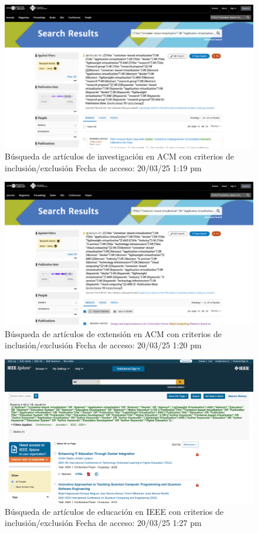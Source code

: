 \FloatBarrier\begin{figure}[H]
	\centering
	\includegraphics[width=\textwidth,keepaspectratio]{apendices/BD/criterios/ACM-inv.png}
	\caption{Búsqueda de artículos de investigación en ACM con criterios de inclusión/exclusión
		Fecha de acceso: 20/03/25 1:19 pm
	}\label{fig:busqueda17}
\end{figure}
\FloatBarrier\begin{figure}[H]
	\centering
	\includegraphics[width=\textwidth,keepaspectratio]{apendices/BD/criterios/ACM-ind.png}
	\caption{Búsqueda de artículos de extensión en ACM con criterios de inclusión/exclusión
		Fecha de acceso: 20/03/25 1:20 pm
	}\label{fig:busqueda18}
\end{figure}
\FloatBarrier\begin{figure}[H]
	\centering
	\includegraphics[width=\textwidth,keepaspectratio]{apendices/BD/criterios/IEEE-ed.png}
	\caption{Búsqueda de artículos de educación en IEEE con criterios de inclusión/exclusión
		Fecha de acceso: 20/03/25 1:27 pm
	}\label{fig:busqueda19}
\end{figure}
